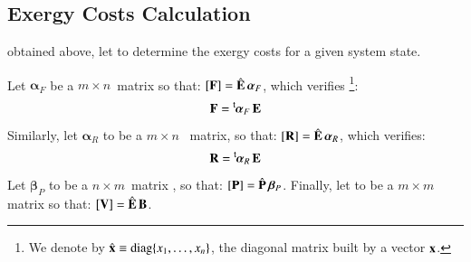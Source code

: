 \documentclass{ecos2018}
\begin{document}
\subsection{Exergy Costs Calculation}
 obtained above, let to determine the exergy costs for a given system state.

Let $\bm{\alpha}_F$ be a $m\times n$~matrix  so that: ${[\mathbf{F}]=\hat{\mathbf{E}}\,\bm{\alpha}_F}$, which verifies
\footnote{We denote by $\hat{\mathbf{x}}\equiv\text{diag}\{x_1,\ldots,x_n\}$, the diagonal matrix built  by a vector $\mathbf{x}$.}:
\begin{equation}
\mathbf{F}=\prescript{\smash{\mathsf{t}}}{}{\mskip-1mu}\bm{\alpha}_F\,\mathbf{E}
\end{equation}
Similarly, let $\bm{\alpha}_R$ to be a  $m\times n$~ matrix, so that: ${\left[ \textbf{R} \right]}=\hat{\mathbf{E}}\,\bm{\alpha}_R$, which verifies:
\begin{equation}
\mathbf{R} = \prescript{\smash{\mathsf{t}}}{}{\mskip-1mu}\bm{\alpha}_R \, \mathbf{E}
\end{equation}
Let  ${\bm{\beta}_P}$ to be a $ n \times m$~matrix , so that: ${\left[ \textbf{P} \right]=\hat{\mathbf{P}}\,\bm{\beta}_P}$.
Finally, let  to be a  $m \times m$ matrix so that: ${\left[ \textbf{V} \right]=\hat{\mathbf{E}}\,\mathbf{B}}$.
\end{document}
